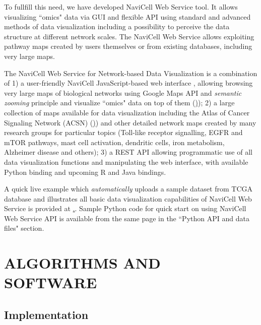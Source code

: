 \documentclass[a4,center,fleqn]{NAR}
\begin{document}
To fullfill this need, we have developed NaviCell Web Service tool. It allows
visualizing ``omics" data via GUI and flexible API using standard and advanced
methods of data visualization including a possibility to perceive the data
structure at different network scales. The NaviCell Web Service allows
exploiting pathway maps created by users themselves or from existing databases,
including very large maps.


\enlargethispage{-65.1pt}

The NaviCell Web Service for Network-based Data
Visualization is a combination of 1) a user-friendly NaviCell JavaScript-based
web interface \cite{kuperstein2013navicell}, allowing browsing very large maps
of biological networks using Google Maps API and \emph{semantic zooming}
principle and visualize ``omics" data on top of them
(\href{https://navicell.curie.fr})); 2) a large collection of maps available for
data visualization including the Atlas of Cancer Signaling Network (ACSN)
(\href{https://acsn.curie.fr}))  and other detailed network maps created by many
research groups for particular topics (Toll-like receptor signalling, EGFR
and mTOR pathways, mast cell activation, dendritic cells, iron metabolism,
Alzheimer disease and others); 3) a REST API allowing programmatic use of all
data visualization functions and manipulating the web interface, with available
Python binding and upcoming R and Java bindings.

A quick live example which \emph{automatically} uploads a sample dataset from
TCGA database and illustrates all basic data visualization capabilities of
NaviCell Web Service is provided at
\href{http://navicell.curie.fr/pages/nav\_web\_service.html}.. Sample Python
code for quick start on using NaviCell Web Service API is available from the
same page in the ``Python API and data files" section.

\section{ALGORITHMS AND SOFTWARE}

\subsection{Implementation}
\end{document}
